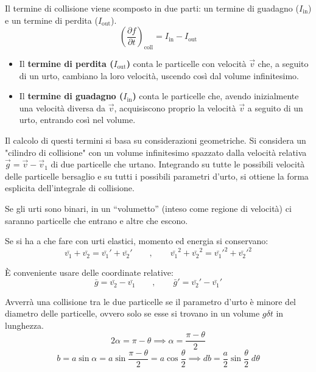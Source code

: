 Il termine di collisione viene scomposto in due parti: un termine di guadagno ($I_{\text{in}}$) e un termine di perdita ($I_{\text{out}}$).
\begin{equation}
    \left( \frac{\partial f}{\partial t} \right)_{\text{coll}} = I_{\text{in}} - I_{\text{out}}
    \label{eq:collision_integral}
\end{equation}

\begin{itemize}
    \item Il \textbf{termine di perdita ($I_{\text{out}}$)} conta le particelle con velocità $\vec{v}$ che, a seguito di un urto, cambiano la loro velocità, uscendo così dal volume infinitesimo.
    \item Il \textbf{termine di guadagno ($I_{\text{in}}$)} conta le particelle che, avendo inizialmente una velocità diversa da $\vec{v}$, acquisiscono proprio la velocità $\vec{v}$ a seguito di un urto, entrando così nel volume.
\end{itemize}

Il calcolo di questi termini si basa su considerazioni geometriche. Si considera un "cilindro di collisione" con un volume infinitesimo spazzato dalla velocità relativa $\vec{g} = \vec{v} - \vec{v}_1$ di due particelle che urtano. Integrando su tutte le possibili velocità delle particelle bersaglio e su tutti i possibili parametri d'urto, si ottiene la forma esplicita dell'integrale di collisione.

Se gli urti sono binari, in un “volumetto” (inteso come regione di velocità) ci saranno particelle che entrano e altre che escono.

Se si ha a che fare con urti elastici, momento ed energia si conservano:
\begin{equation}
    \bar{v_1}+  \bar{v_2} =\bar{v_1}'+  \bar{v_2}' \quad \quad , \quad \quad \bar{v_1}^2+  \bar{v_2}^2 =\bar{v_1}'^2+  \bar{v_2}'^2
    \label{eq:elastic_collision}
\end{equation}

È conveniente usare delle coordinate relative:
\begin{equation}
    \bar{g}= \bar{v_2}-\bar{v_1} \quad \quad , \quad \quad \bar{g}'= \bar{v_2}'-\bar{v_1}'
    \label{eq:relative_coords}
\end{equation}

Avverrà una collisione tra le due particelle se il parametro d’urto è minore del diametro delle particelle, ovvero solo se esse si trovano in un volume $g \delta t$ in lunghezza.
\begin{equation}
    2 \alpha = \pi - \theta \implies \alpha = \frac{\pi - \theta}{2}
    \label{eq:alpha_theta}
\end{equation}
\begin{equation}
    b = a \sin \alpha  = a \sin \frac{\pi - \theta}{2} = a \cos \frac{ \theta}{2} \implies db = \frac{a}{2}\sin \frac{ \theta}{2}  \; d\theta
    \label{eq:impact_parameter}
\end{equation}

